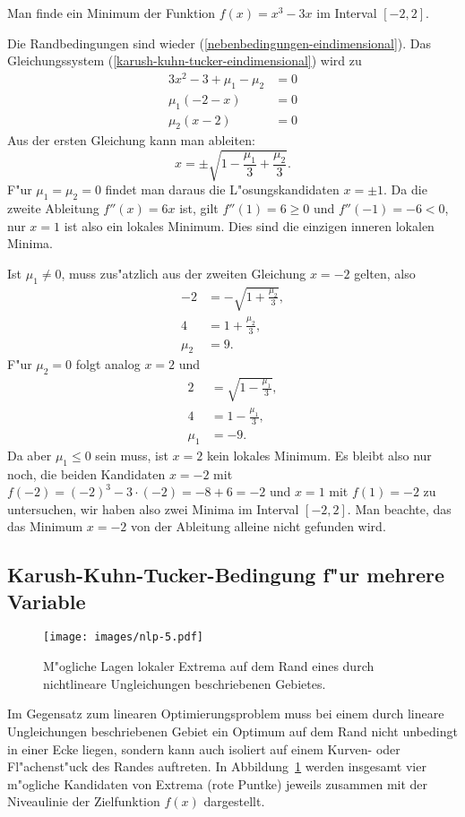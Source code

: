 \begin{beispiel}
Man finde ein Minimum der Funktion $f(x)=x^3-3x$ im Interval $[-2,2]$.

\medskip
{\parindent 0pt
Die Randbedingungen sind wieder (\ref{nebenbedingungen-eindimensional}).}
Das Gleichungssystem (\ref{karush-kuhn-tucker-eindimensional}) wird
zu
\begin{align*}
3x^2-3+\mu_1-\mu_2&=0\\
\mu_1(-2-x)&= 0\\
\mu_2(x-2)&= 0
\end{align*}
Aus der ersten Gleichung kann man ableiten:
\[
x=\pm
\sqrt{1-\frac{\mu_1}3+\frac{\mu_2}3}.
\]
F"ur $\mu_1=\mu_2=0$ findet man daraus die L"osungskandidaten
$x=\pm 1$. Da die zweite Ableitung $f''(x)=6x$ ist, gilt $f''(1)=6\ge 0$
und $f''(-1)=-6<0$, nur $x=1$ ist also ein lokales Minimum. Dies sind die
einzigen inneren lokalen Minima.

Ist $\mu_1\ne 0$, muss zus"atzlich aus der zweiten
Gleichung $x=-2$ gelten, also
\begin{align*}
-2&=-\sqrt{1+\frac{\mu_2}3},\\
4&=1+\frac{\mu_2}3,\\
\mu_2&=9.
\end{align*}
F"ur $\mu_2=0$  folgt analog $x=2$ und
\begin{align*}
2&=\sqrt{1-\frac{\mu_1}3},\\
4&=1-\frac{\mu_1}3,\\
\mu_1&=-9.
\end{align*}
Da aber $\mu_1\le 0$ sein muss, ist $x=2$ kein lokales Minimum.
Es bleibt also nur noch, die beiden Kandidaten $x=-2$
mit $f(-2)=(-2)^3-3\cdot(-2)=-8+6=-2$
und $x=1$ mit $f(1)=-2$
zu untersuchen, wir haben also zwei Minima im Interval $[-2,2]$.
Man beachte, das das Minimum $x=-2$ von der Ableitung alleine nicht
gefunden wird.
\end{beispiel}

\subsection{Karush-Kuhn-Tucker-Bedingung f"ur mehrere Variable}
\begin{figure}
\begin{center}
\texttt{[image: images/nlp-5.pdf]}
\end{center}
\caption{M"ogliche Lagen lokaler Extrema auf dem Rand eines durch
nichtlineare
Ungleichungen beschriebenen Gebietes.\label{nlp:kkt-moegliche-extrema}}
\end{figure}
Im Gegensatz zum linearen Optimierungsproblem muss bei einem durch
lineare Ungleichungen beschriebenen Gebiet ein
Optimum auf dem Rand nicht unbedingt in einer Ecke liegen,
sondern kann auch isoliert auf einem Kurven- oder Fl"achenst"uck
des Randes auftreten.
In Abbildung~\ref{nlp:kkt-moegliche-extrema} werden insgesamt
vier m"ogliche Kandidaten von Extrema (rote Puntke) jeweils zusammen mit
der Niveaulinie der Zielfunktion $f(x)$ dargestellt.

